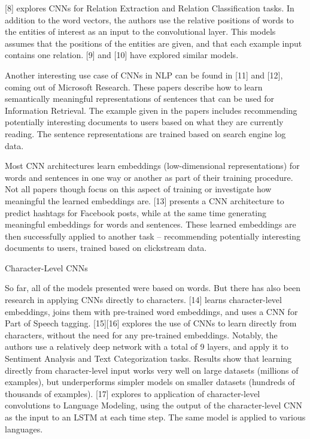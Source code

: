 [8] explores CNNs for Relation Extraction and Relation Classification tasks. In addition to the word vectors, the authors use the relative positions of words to the entities of interest as an input to the convolutional layer. This models assumes that the positions of the entities are given, and that each example input contains one relation. [9] and [10] have explored similar models.

Another interesting use case of CNNs in NLP can be found in [11] and [12], coming out of Microsoft Research. These papers describe how to learn semantically meaningful representations of sentences that can be used for Information Retrieval. The example given in the papers includes recommending potentially interesting documents to users based on what they are currently reading. The sentence representations are trained based on search engine log data.

Most CNN architectures learn embeddings (low-dimensional representations) for words and sentences in one way or another as part of their training procedure. Not all papers though focus on this aspect of training or investigate how meaningful the learned embeddings are. [13] presents a CNN architecture to predict hashtags for Facebook posts, while at the same time generating meaningful embeddings for words and sentences. These learned embeddings are then successfully applied to another task – recommending potentially interesting documents to users, trained based on clickstream data.

Character-Level CNNs

So far, all of the models presented were based on words. But there has also been research in applying CNNs directly to characters. [14] learns character-level embeddings, joins them with pre-trained word embeddings, and uses a CNN for Part of Speech tagging. [15][16] explores the use of CNNs to learn directly from characters, without the need for any pre-trained embeddings. Notably, the authors use a relatively deep network with a total of 9 layers, and apply it to Sentiment Analysis and Text Categorization tasks. Results show that learning directly from character-level input works very well on large datasets (millions of examples), but underperforms simpler models on smaller datasets (hundreds of thousands of examples). [17] explores to application of character-level convolutions to Language Modeling, using the output of the character-level CNN as the input to an LSTM at each time step. The same model is applied to various languages.

